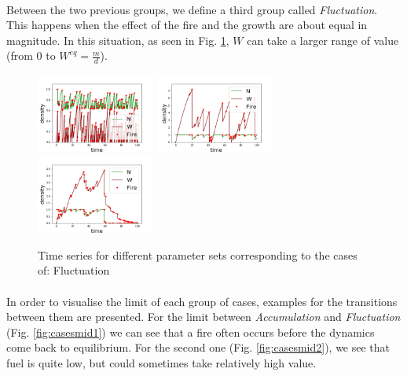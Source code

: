 \documentclass{article}
\begin{document}
\paragraph{}
Between the two previous groups, we define a third group called \textit{Fluctuation}. This happens when the effect of the fire and the growth are about equal in magnitude. In this situation, as seen in Fig. \ref{fig:casesfluc}, $W$ can take a larger range of value (from $0$ to $W^{eq}=\frac{m}{d}$).
\begin{figure}[h!]
\centering
\includegraphics[width=3.9cm]{middle_1.png}
\includegraphics[width=3.9cm]{middle_2.png}
\includegraphics[width=3.9cm]{middle_3.png}
\caption{Time series for different parameter sets corresponding to the cases of: Fluctuation}
\label{fig:casesfluc}
\end{figure}


\newpage
\paragraph{}
In order to visualise the limit of each group of cases, examples for the transitions between them are presented.
For the limit between \textit{Accumulation} and \textit{Fluctuation} (Fig. \ref{fig:casesmid1}) we can see that a fire often occurs before the dynamics come back to equilibrium. For the second one (Fig. \ref{fig:casesmid2}), we see that fuel is quite low, but could sometimes take relatively high value.
\end{document}
